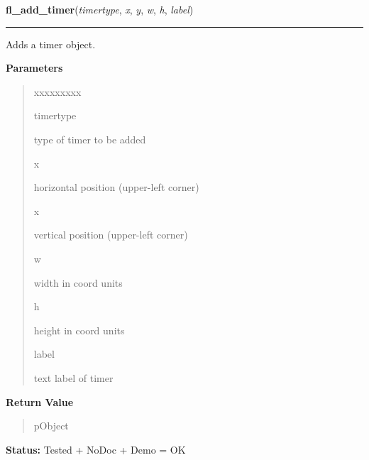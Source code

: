     \label{xformslib:library:fl_add_timer}

    \vspace{0.5ex}

\hspace{.8\funcindent}\begin{boxedminipage}{\funcwidth}

    \raggedright \textbf{fl\_add\_timer}(\textit{timertype}, \textit{x}, \textit{y}, \textit{w}, \textit{h}, \textit{label})

    \vspace{-1.5ex}

    \rule{\textwidth}{0.5\fboxrule}
\setlength{\parskip}{2ex}
    Adds a timer object.

\setlength{\parskip}{1ex}
      \textbf{Parameters}
      \vspace{-1ex}

      \begin{quote}
        \begin{Ventry}{xxxxxxxxx}

          \item[timertype]

          type of timer to be added

          \item[x]

          horizontal position (upper-left corner)

          \item[x]

          vertical position (upper-left corner)

          \item[w]

          width in coord units

          \item[h]

          height in coord units

          \item[label]

          text label of timer

        \end{Ventry}

      \end{quote}

      \textbf{Return Value}
    \vspace{-1ex}

      \begin{quote}
      pObject

      \end{quote}

\textbf{Status:} Tested + NoDoc + Demo = OK



    \end{boxedminipage}

